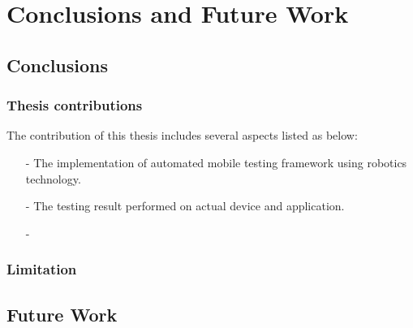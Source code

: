 \chapter{Conclusions and Future Work}

\section{Conclusions}
\subsection{Thesis contributions}
	The contribution of this thesis includes several aspects listed as below:
	\begin{itemize}
		\item[-] The implementation of automated mobile testing framework using robotics technology.
		\item[-] The testing result performed on actual device and application.
		\item[-]
	\end{itemize}
\subsection{Limitation}

\section{Future Work}